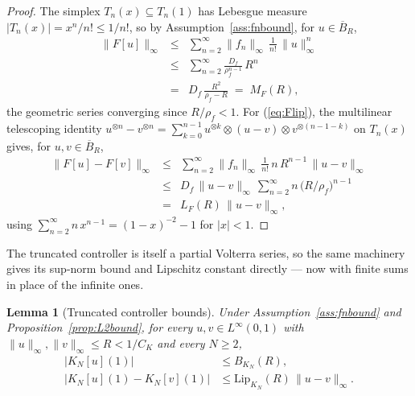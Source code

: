 \documentclass[10pt,a4paper]{amsart}
\newtheorem{lemma}{Lemma}
\newcommand{\Linf}{L^\infty}
\newcommand{\LipKn}{\mathrm{Lip}_{K_N}}
\begin{document}
\begin{proof}
The simplex $T_n(x) \subseteq T_n(1)$ has Lebesgue measure $|T_n(x)| = x^n/n! \le 1/n!$, so by Assumption~\ref{ass:fnbound}, for $u \in \overline B_R$,
\begin{eqnarray}
\|F[u]\|_\infty &\le & \sum_{n=2}^\infty \|f_n\|_\infty\,\frac{1}{n!}\,\|u\|_\infty^n \nonumber\\
&\le& \sum_{n=2}^\infty \frac{D_f}{\rho_f^{n-1}}\,R^n \nonumber\\
&=& D_f\,\frac{R^2}{\rho_f - R} \;=\; M_F(R),
\label{eq:Fbound_proof}
\end{eqnarray}
the geometric series converging since $R/\rho_f < 1$. For (\ref{eq:Flip}), the multilinear telescoping identity $u^{\otimes n} - v^{\otimes n} = \sum_{k=0}^{n-1} u^{\otimes k} \otimes (u-v) \otimes v^{\otimes(n-1-k)}$ on $T_n(x)$ gives, for $u, v \in \overline B_R$,
\begin{eqnarray}
\|F[u] - F[v]\|_\infty &\le & \sum_{n=2}^\infty \|f_n\|_\infty\,\frac{1}{n!}\,n\,R^{n-1}\,\|u - v\|_\infty \nonumber\\
&\le & D_f\,\|u - v\|_\infty\,\sum_{n=2}^\infty n\,\bigl(R/\rho_f\bigr)^{n-1} \nonumber\\
&=& L_F(R)\,\|u - v\|_\infty,
\label{eq:Flip_proof}
\end{eqnarray}
using $\sum_{n=2}^\infty n\,x^{n-1} = (1-x)^{-2} - 1$ for $|x| < 1$.
\end{proof}

The truncated controller is itself a partial Volterra series, so the same machinery gives its sup-norm bound and Lipschitz constant directly --- now with finite sums in place of the infinite ones.

\begin{lemma}[Truncated controller bounds]\label{lem:KNbounds}
Under Assumption~\ref{ass:fnbound} and Proposition~\ref{prop:L2bound}, for every $u, v \in \Linf(0,1)$ with $\|u\|_\infty, \|v\|_\infty \le R < 1/C_K$ and every $N \ge 2$,
\begin{align}
|K_N[u](1)| &\le B_{K_N}(R), \label{eq:KNbound}\\
|K_N[u](1) - K_N[v](1)| &\le \LipKn(R)\,\|u - v\|_\infty. \label{eq:KNlip}
\end{align}
\end{lemma}
\end{document}

